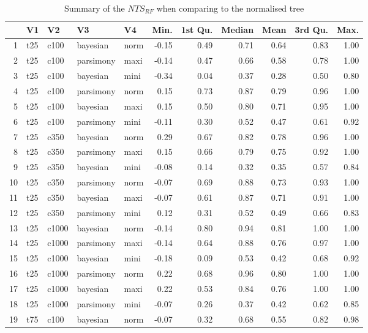 \documentclass[12pt,letterpaper]{article}
\begin{document}
\begin{longtable}{rllllrrrrrr}
\caption{Summary of the $NTS_{RF}$ when comparing to the normalised tree}\\

  \hline
 & V1 & V2 & V3 & V4 & Min. & 1st Qu. & Median & Mean & 3rd Qu. & Max. \\ 
  \hline
1 & t25 & c100 & bayesian & norm & -0.15 & 0.49 & 0.71 & 0.64 & 0.83 & 1.00 \\ 
  2 & t25 & c100 & parsimony & maxi & -0.14 & 0.47 & 0.66 & 0.58 & 0.78 & 1.00 \\ 
  3 & t25 & c100 & bayesian & mini & -0.34 & 0.04 & 0.37 & 0.28 & 0.50 & 0.80 \\ 
  4 & t25 & c100 & parsimony & norm & 0.15 & 0.73 & 0.87 & 0.79 & 0.96 & 1.00 \\ 
  5 & t25 & c100 & bayesian & maxi & 0.15 & 0.50 & 0.80 & 0.71 & 0.95 & 1.00 \\ 
  6 & t25 & c100 & parsimony & mini & -0.11 & 0.30 & 0.52 & 0.47 & 0.61 & 0.92 \\ 
  7 & t25 & c350 & bayesian & norm & 0.29 & 0.67 & 0.82 & 0.78 & 0.96 & 1.00 \\ 
  8 & t25 & c350 & parsimony & maxi & 0.15 & 0.66 & 0.79 & 0.75 & 0.92 & 1.00 \\ 
  9 & t25 & c350 & bayesian & mini & -0.08 & 0.14 & 0.32 & 0.35 & 0.57 & 0.84 \\ 
  10 & t25 & c350 & parsimony & norm & -0.07 & 0.69 & 0.88 & 0.73 & 0.93 & 1.00 \\ 
  11 & t25 & c350 & bayesian & maxi & -0.07 & 0.61 & 0.87 & 0.71 & 0.91 & 1.00 \\ 
  12 & t25 & c350 & parsimony & mini & 0.12 & 0.31 & 0.52 & 0.49 & 0.66 & 0.83 \\ 
  13 & t25 & c1000 & bayesian & norm & -0.14 & 0.80 & 0.94 & 0.81 & 1.00 & 1.00 \\ 
  14 & t25 & c1000 & parsimony & maxi & -0.14 & 0.64 & 0.88 & 0.76 & 0.97 & 1.00 \\ 
  15 & t25 & c1000 & bayesian & mini & -0.18 & 0.09 & 0.53 & 0.42 & 0.68 & 0.92 \\ 
  16 & t25 & c1000 & parsimony & norm & 0.22 & 0.68 & 0.96 & 0.80 & 1.00 & 1.00 \\ 
  17 & t25 & c1000 & bayesian & maxi & 0.22 & 0.53 & 0.84 & 0.76 & 1.00 & 1.00 \\ 
  18 & t25 & c1000 & parsimony & mini & -0.07 & 0.26 & 0.37 & 0.42 & 0.62 & 0.85 \\ 
  19 & t75 & c100 & bayesian & norm & -0.07 & 0.32 & 0.68 & 0.55 & 0.82 & 0.98 \\ 

\end{longtable}
\end{document}
